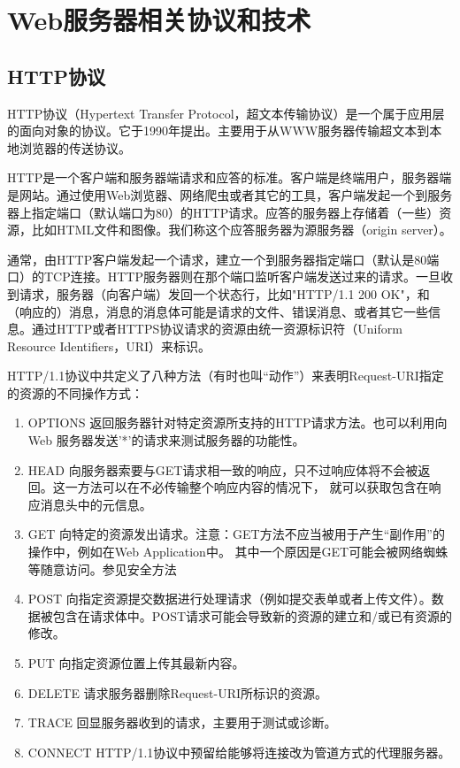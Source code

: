 \documentclass[twoside, xetex]{report}
\begin{document}
\chapter{Web服务器相关协议和技术}

\section{HTTP协议}
	HTTP协议（Hypertext Transfer Protocol，超文本传输协议）是一个属于应用层的面向对象的协议。它于1990年提出。主要用于从WWW服务器传输超文本到本地浏览器的传送协议。
	
	HTTP是一个客户端和服务器端请求和应答的标准。客户端是终端用户，服务器端是网站。通过使用Web浏览器、网络爬虫或者其它的工具，客户端发起一个到服务器上指定端口（默认端口为80）的HTTP请求。应答的服务器上存储着（一些）资源，比如HTML文件和图像。我们称这个应答服务器为源服务器（origin server）。
	
	通常，由HTTP客户端发起一个请求，建立一个到服务器指定端口（默认是80端口）的TCP连接。HTTP服务器则在那个端口监听客户端发送过来的请求。一旦收到请求，服务器（向客户端）发回一个状态行，比如"HTTP/1.1 200 OK"，和（响应的）消息，消息的消息体可能是请求的文件、错误消息、或者其它一些信息。通过HTTP或者HTTPS协议请求的资源由统一资源标识符（Uniform Resource Identifiers，URI）来标识。
	
	HTTP/1.1协议中共定义了八种方法（有时也叫“动作”）来表明Request-URI指定的资源的不同操作方式：
	\begin{enumerate}
		\item OPTIONS 返回服务器针对特定资源所支持的HTTP请求方法。也可以利用向Web 服务器发送'*'的请求来测试服务器的功能性。
		\item HEAD 向服务器索要与GET请求相一致的响应，只不过响应体将不会被返回。这一方法可以在不必传输整个响应内容的情况下，
					就可以获取包含在响应消息头中的元信息。
		\item GET 向特定的资源发出请求。注意：GET方法不应当被用于产生“副作用”的操作中，例如在Web Application中。
					其中一个原因是GET可能会被网络蜘蛛等随意访问。参见安全方法
		\item POST 向指定资源提交数据进行处理请求（例如提交表单或者上传文件）。数据被包含在请求体中。POST请求可能会导致新的资源的建立和/或已有资源的修改。
		\item PUT 向指定资源位置上传其最新内容。
		\item DELETE 请求服务器删除Request-URI所标识的资源。
		\item TRACE 回显服务器收到的请求，主要用于测试或诊断。
		\item CONNECT HTTP/1.1协议中预留给能够将连接改为管道方式的代理服务器。
	\end{enumerate}
	
\end{document}
